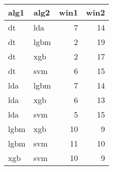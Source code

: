 \begin{tabular}{llrr}
  \toprule
{\bfseries alg1} & {\bfseries alg2} & {\bfseries win1} & {\bfseries win2} \\ 
  \midrule
dt & lda & 7 & 14 \\ 
  dt & lgbm & 2 & 19 \\ 
  dt & xgb & 2 & 17 \\ 
  dt & svm & 6 & 15 \\ 
  lda & lgbm & 7 & 14 \\ 
  lda & xgb & 6 & 13 \\ 
  lda & svm & 5 & 15 \\ 
  lgbm & xgb & 10 & 9 \\ 
  lgbm & svm & 11 & 10 \\ 
  xgb & svm & 10 & 9 \\ 
   \bottomrule
\end{tabular}
